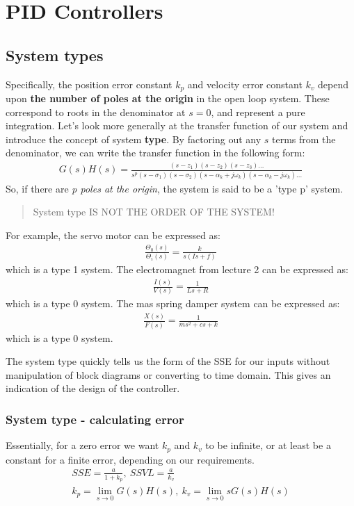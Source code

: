 \chapter{PID Controllers}
\section{System types}
Specifically, the position error constant $k_p$ and velocity error constant $k_v$ depend upon \textbf{the number of poles at the origin} in the open loop system. These correspond to roots in the denominator at $s=0$, and represent a pure integration. Let's look more generally at the transfer function of our system and introduce the concept of system \textbf{type}. By factoring out any $s$ terms from the denominator, we can write the transfer function in the following form:
\begin{gather}
  G(s)H(s) = \frac{(s-z_1)(s-z_2)(s-z_3)...}{s^p(s-\sigma_1)(s-\sigma_2)(s-\alpha_k + j\omega_k)(s-\alpha_k - j\omega_k)...}
\end{gather}
So, if there are \textit{p poles at the origin}, the system is said to be a 'type p' system.
\begin{quote}
  System type IS NOT THE ORDER OF THE SYSTEM!
\end{quote}
For example, the servo motor can be expressed as:
\begin{gather}
  \frac{\Theta_0(s)}{\Theta_i(s)}=\frac{k}{s(Is +f)}
\end{gather}
which is a type 1 system. The electromagnet from lecture 2 can be expressed as:
\begin{gather}
  \frac{I(s)}{V(s)} = \frac{1}{Ls +R}
\end{gather}
which is a type 0 system. The mas spring damper system can be expressed as:
\begin{gather}
  \frac{X(s)}{F(s)} = \frac{1}{ms^2 + cs + k}
\end{gather}
which is a type 0 system.

The system type quickly tells us the form of the SSE for our inputs without manipulation of block diagrams or converting to time domain. This gives an indication of the design of the controller.
\subsection{System type - calculating error}
Essentially, for a zero error we want $k_p$ and $k_v$ to be infinite, or at least be a constant for a finite error, depending on our requirements.
\begin{gather}
  SSE = \frac{a}{1+ k_p}, \ SSVL = \frac{a}{k_v}\\
  k_p = \lim_{s\rightarrow 0} G(s)H(s), \ k_v = \lim_{s\rightarrow 0}sG(s)H(s)
\end{gather}
